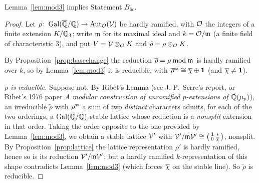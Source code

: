 \documentclass[11pt]{article}
\begin{document}
\begin{proposition}\label{prop:B6c}
Lemma~\ref{lem:mod3} implies Statement $B_{6c}$.
\end{proposition}

\begin{proof}
Let $\rho\colon\operatorname{Gal}(\overline{\mathbb{Q}}/\mathbb{Q})\to\operatorname{Aut}_{\mathcal{O}}(\mathcal{V})$ be hardly ramified, with $\mathcal{O}$ the
integers of a finite extension $K/\mathbb{Q}_3$; write $\mathfrak{m}$ for its maximal ideal and
$k=\mathcal{O}/\mathfrak{m}$ (a finite field of characteristic $3$), and put
$V=\mathcal{V}\otimes_{\mathcal{O}} K$ and $\tilde\rho=\rho\otimes_{\mathcal{O}} K$.

By Proposition~\ref{prop:basechange} the reduction $\overline{\rho}=\rho\bmod\mathfrak{m}$ is
hardly ramified over $k$, so by Lemma~\ref{lem:mod3} it is reducible, with
$\overline{\rho}^{\mathrm{ss}}\cong\overline{\chi}\oplus\mathbf1$ (and $\overline{\chi}\neq\mathbf1$).

\emph{$\tilde\rho$ is reducible.} Suppose not. By Ribet's Lemma (see
J.-P.~Serre's report, or Ribet's 1976 paper \emph{A modular construction of
unramified $p$-extensions of $\mathbb{Q}(\mu_p)$}), an irreducible $\tilde\rho$ with
$\overline{\rho}^{\mathrm{ss}}$ a sum of two \emph{distinct} characters admits, for each
of the two orderings, a $\operatorname{Gal}(\overline{\mathbb{Q}}/\mathbb{Q})$-stable lattice whose reduction is a
\emph{nonsplit} extension in that order. Taking the order opposite to the one
provided by Lemma~\ref{lem:mod3}, we obtain a stable lattice $\mathcal{V}'$ with
$\mathcal{V}'/\mathfrak{m}\mathcal{V}'\cong\left(\begin{smallmatrix}\mathbf1&*\\0&\overline{\chi}\end{smallmatrix}\right)$,
nonsplit. By Proposition~\ref{prop:lattice} the lattice representation $\rho'$
is hardly ramified, hence so is its reduction $\mathcal{V}'/\mathfrak{m}\mathcal{V}'$; but a hardly
ramified $k$-representation of this shape contradicts Lemma~\ref{lem:mod3}
(which forces $\overline{\chi}$ on the stable line). So $\tilde\rho$ is reducible.


\end{proof}
\end{document}

